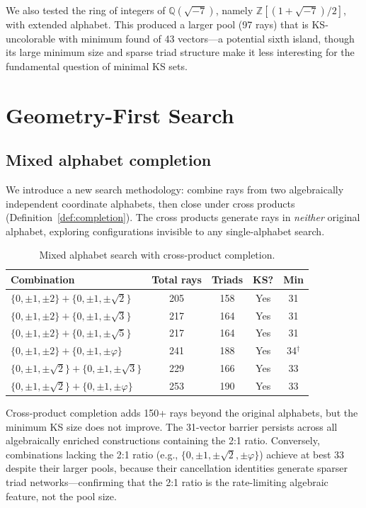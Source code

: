 \documentclass[12pt,a4paper]{article}
\newcommand{\Z}{\mathbb{Z}}
\newcommand{\Q}{\mathbb{Q}}
\begin{document}
We also tested the ring of integers of $\Q(\sqrt{-7})$, namely $\Z[(1+\sqrt{-7})/2]$, with extended alphabet. This produced a larger pool (97 rays) that is KS-uncolorable with minimum found of 43 vectors---a potential sixth island, though its large minimum size and sparse triad structure make it less interesting for the fundamental question of minimal KS sets.

\section{Geometry-First Search}\label{sec:geometry}

\subsection{Mixed alphabet completion}\label{sec:mixed}

We introduce a new search methodology: combine rays from two algebraically independent coordinate alphabets, then close under cross products (Definition~\ref{def:completion}). The cross products generate rays in \emph{neither} original alphabet, exploring configurations invisible to any single-alphabet search.

\begin{table}[ht]
\centering
\caption{Mixed alphabet search with cross-product completion.}
\label{tab:mixed}
\begin{tabular}{lcccc}
\toprule
Combination & Total rays & Triads & KS? & Min \\
\midrule
$\{0,\pm 1,\pm 2\} + \{0,\pm 1,\pm\sqrt{2}\}$ & 205 & 158 & Yes & 31 \\
$\{0,\pm 1,\pm 2\} + \{0,\pm 1,\pm\sqrt{3}\}$ & 217 & 164 & Yes & 31 \\
$\{0,\pm 1,\pm 2\} + \{0,\pm 1,\pm\sqrt{5}\}$ & 217 & 164 & Yes & 31 \\
$\{0,\pm 1,\pm 2\} + \{0,\pm 1,\pm\varphi\}$ & 241 & 188 & Yes & 34$^\dagger$ \\
$\{0,\pm 1,\pm\sqrt{2}\} + \{0,\pm 1,\pm\sqrt{3}\}$ & 229 & 166 & Yes & 33 \\
$\{0,\pm 1,\pm\sqrt{2}\} + \{0,\pm 1,\pm\varphi\}$ & 253 & 190 & Yes & 33 \\
\bottomrule
\end{tabular}
\end{table}

Cross-product completion adds 150+ rays beyond the original alphabets, but the minimum KS size does not improve. The 31-vector barrier persists across all algebraically enriched constructions containing the 2:1 ratio. Conversely, combinations lacking the 2:1 ratio (e.g., $\{0,\pm 1,\pm\sqrt{2},\pm\varphi\}$) achieve at best 33 despite their larger pools, because their cancellation identities generate sparser triad networks---confirming that the 2:1 ratio is the rate-limiting algebraic feature, not the pool size.
\end{document}
